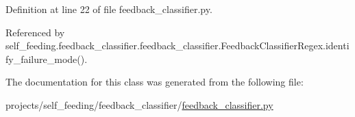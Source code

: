 Definition at line 22 of file feedback\+\_\+classifier.\+py.



Referenced by self\+\_\+feeding.\+feedback\+\_\+classifier.\+feedback\+\_\+classifier.\+Feedback\+Classifier\+Regex.\+identify\+\_\+failure\+\_\+mode().



The documentation for this class was generated from the following file\+:\begin{DoxyCompactItemize}
\item 
projects/self\+\_\+feeding/feedback\+\_\+classifier/\hyperlink{feedback__classifier_8py}{feedback\+\_\+classifier.\+py}\end{DoxyCompactItemize}
